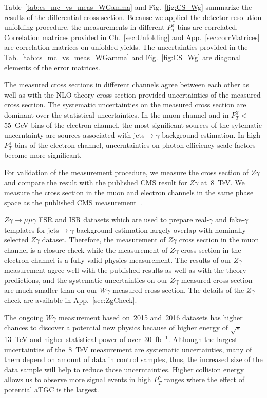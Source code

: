 Table~\ref{tab:cs_mc_vs_meas_WGamma} and Fig.~\ref{fig:CS_Wg} summarize the results of the differential cross section. Because we applied the detector resolution unfolding procedure, the measurements in different $P_T^{\gamma}$ bins are correlated. Correlation matrices provided in Ch.~\ref{sec:Unfolding} and App.~\ref{sec:corrMatrices} are correlation matrices on unfolded yields. The uncertainties provided in the Tab.~\ref{tab:cs_mc_vs_meas_WGamma} and Fig.~\ref{fig:CS_Wg} are diagonal elements of the error matrices.

The measured cross sections in different channels agree between each other as well as with the NLO theory cross section provided uncertainties of the measured cross section. The systematic uncertainties on the measured cross section are dominant over the statistical uncertainties. In the muon channel and in $P_T^{\gamma}<$55~GeV bins of the electron channel, the most significant sources of the sytematic uncerntainty are sources associated with jets$\rightarrow\gamma$ background estimation. In high $P_T^{\gamma}$ bins of the electron channel, uncerntainties on photon efficiency scale factors become more significant.

For validation of the measurement procedure, we measure the cross section of $Z\gamma$ and compare the result with the published CMS result for $Z\gamma$ at~8~TeV. We measure the cross section in the muon and electron channels in the same phase space as the published CMS measurement~\cite{ref_Zg8TeV}. 

$Z\gamma\rightarrow\mu\mu\gamma$ FSR and ISR datasets which are used to prepare real-$\gamma$ and fake-$\gamma$ templates for jets$\rightarrow\gamma$ background estimation largely overlap with nominally selected $Z\gamma$ dataset. Therefore, the measurement of $Z\gamma$ cross section in the muon channel is a closure check while the measurement of $Z\gamma$ cross section in the electron channel is a fully valid physics measurement. The results of our $Z\gamma$ measurement agree well with the published results as well as with the theory predictions, and the systematic uncertainties on our $Z\gamma$ measured cross section are much smaller than on our $W\gamma$ measured cross section. The details of the $Z\gamma$ check are available in App.~\ref{sec:ZgCheck}.

The ongoing $W\gamma$ measurement based on~2015 and~2016 datasets has higher chances to discover a potential new physics because of higher energy of $\sqrt{s}=$13~TeV and higher statistical power of over~30~fb$^{-1}$. Although the largest uncertainties of the~8~TeV measurement are systematic uncertainties, many of them depend on amount of data in control samples, thus, the increased size of the data sample will help to reduce those uncerntainties. Higher collision energy allows us to observe more signal events in high $P_T^{\gamma}$ ranges where the effect of potential aTGC is the largest. 

